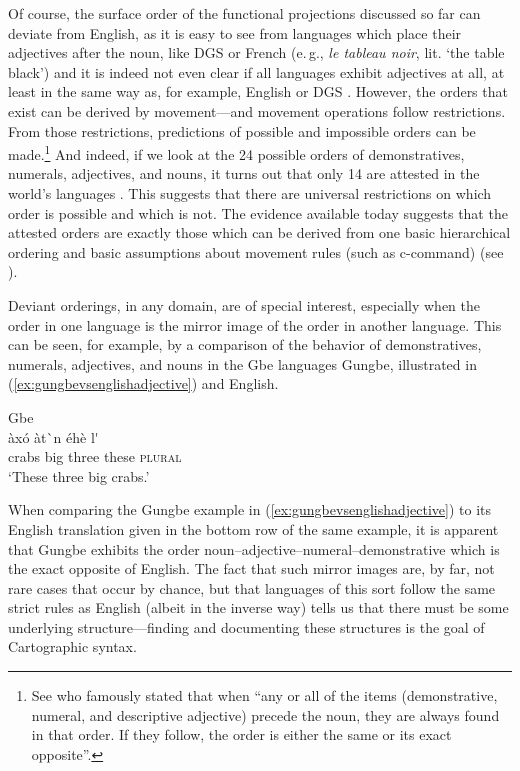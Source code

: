 Of course, the surface order of the  functional projections discussed so far can deviate from English, as it is easy to see from languages which place their adjectives after the noun, like DGS or French (e.\,g., \textit{le tableau noir}, lit. `the table black') and it is indeed not even clear if all languages exhibit adjectives at all, at least in the same way as, for example, English or DGS \citep{croft1991syntactic,dixon2004adjective}. However, the orders that exist can be derived by movement---and movement operations follow restrictions. From those restrictions, predictions of possible and impossible orders can be made.\footnote{ See \citet[87]{greenberg1963some} who famously stated that when ``any or all of the items (demonstrative, numeral, and descriptive adjective) precede the noun, they are always found in that order. If they follow, the order is either the same or its exact opposite''. } 
And indeed, if we look at the 24 possible orders of demonstratives, numerals, adjectives, and nouns, it turns out that only 14 are attested in the world's languages \citep{cinque2006restructuring,abels2009universal}. This suggests that there are universal restrictions on which order is possible and which is not. The evidence available today suggests that the attested orders are exactly those which can be derived from one basic hierarchical ordering and basic assumptions about movement rules (such as c-command) (see \citealt{medeiros2012movement}). 

Deviant orderings, in any domain, are of special interest, especially when the order in one language is the mirror image of the order in another language. This can be seen, for example, by a comparison of the behavior of demonstratives, numerals, adjectives, and nouns in the Gbe languages Gungbe, illustrated in (\ref{ex:gungbevsenglishadjective}) and English.

\begin{exe}
\ex Gbe \citep[92]{aboh2004morphosyntax} \\
 {\textrtaild àxó} {àt\`{\textopeno }n} {éhè} {l\'{\textepsilon }} \\
{crabs} {big} {three} {these} {\textsc{plural}} \\
\trans `These three big crabs.' \label{ex:gungbevsenglishadjective}
\end{exe} 


\noindent When comparing the Gungbe example in (\ref{ex:gungbevsenglishadjective}) to its English translation given in the bottom row of the same example, it is apparent that Gungbe exhibits the order noun--adjective--numeral--demonstrative which is the exact opposite of English. The fact that such mirror images are, by far, not rare cases that occur by chance, but that languages of this sort follow the same strict rules as English (albeit in the inverse way) tells us that there must be some underlying structure---finding and documenting these structures is the goal of Cartographic syntax.


